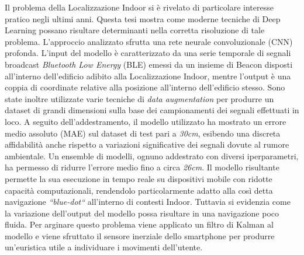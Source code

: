 \documentclass{standalone}
\begin{document}
Il problema della Localizzazione Indoor si è rivelato di particolare interesse
pratico negli ultimi anni. Questa tesi mostra come moderne tecniche di Deep
Learning possano risultare determinanti nella corretta risoluzione di tale
problema.
L'approccio analizzato sfrutta una rete neurale convoluzionale (CNN) profonda.
L'input del modello è caratterizzato da una serie temporale di segnali
broadcast \emph{Bluetooth Low Energy} (BLE) emessi da un insieme di Beacon
disposti all'interno dell'edificio adibito alla Localizzazione Indoor, mentre
l'output è una coppia di coordinate relative alla posizione all'interno
dell'edificio stesso. Sono state inoltre utilizzate varie tecniche di
\emph{data augmentation} per produrre un dataset di grandi dimensioni sulla
base dei campionamenti dei segnali effettuati in loco.
A seguito dell'addestramento, il modello utilizzato ha mostrato un errore medio
assoluto (MAE) sul dataset di test pari a \emph{30cm}, esibendo una discreta
affidabilità anche rispetto a variazioni significative dei segnali dovute al
rumore ambientale. Un ensemble di modelli, ognuno addestrato con diversi
iperparametri, ha permesso di ridurre l'errore medio fino a circa \emph{26cm}.
Il modello risultante permette la sua esecuzione in tempo reale su dispositivi
mobile con ridotte capacità computazionali, rendendolo particolarmente adatto
alla 
così detta navigazione \emph{``blue-dot``} all'interno di contesti Indoor.
Tuttavia si evidenzia come la variazione dell'output del modello possa
risultare in una navigazione poco fluida. Per arginare questo problema viene
applicato un filtro di Kalman al modello e viene sfruttato il sensore inerziale
dello smartphone per produrre un'euristica utile a individuare i movimenti
dell'utente.  
\end{document}
